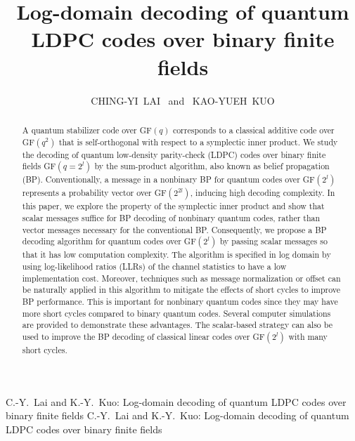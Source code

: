 \documentclass{ieeeaccess}
\theoremstyle{definition}		%
\begin{document}



\title{Log-domain decoding of quantum LDPC codes over binary finite fields}

\author{	\uppercase{Ching-Yi~Lai} %
	~and~	\uppercase{Kao-Yueh~Kuo} %
}
\address{Institute of Communications Engineering, National Yang Ming Chiao Tung University, Hsinchu 30010, Taiwan.}



\markboth
{C.-Y.~Lai and K.-Y.~Kuo: Log-domain decoding of quantum LDPC codes over binary finite fields}
{C.-Y.~Lai and K.-Y.~Kuo: Log-domain decoding of quantum LDPC codes over binary finite fields}



\begin{abstract}
A quantum stabilizer code over GF$(q)$ corresponds to a classical additive code over GF$(q^2)$ that is self-orthogonal with respect to a symplectic inner product. We study the decoding of quantum low-density parity-check (LDPC) codes over binary finite fields GF$(q=2^l)$ by the sum-product algorithm, also known as belief propagation (BP). Conventionally, a message in a nonbinary BP for quantum codes over GF$(2^l)$ represents a probability vector over GF$(2^{2l})$, inducing high decoding complexity. In this paper, we explore the property of the symplectic inner product and show that scalar messages suffice for BP decoding of nonbinary quantum codes, rather than vector messages necessary for the conventional BP. Consequently, we propose a BP decoding algorithm for quantum codes over GF$(2^l)$ by passing scalar messages so that it has low computation complexity. The algorithm is specified in log domain by using log-likelihood ratios (LLRs) of the channel statistics to have a low implementation cost. Moreover, techniques such as message normalization or offset can be naturally applied in this algorithm to mitigate the effects of short cycles to improve BP performance. This is important for nonbinary quantum codes since they may have more short cycles compared to binary quantum codes. Several computer simulations are provided to demonstrate these advantages. The scalar-based strategy can also be used to improve the BP decoding of classical linear codes over GF$(2^l)$ with many short cycles.
\end{abstract}
\end{document}
